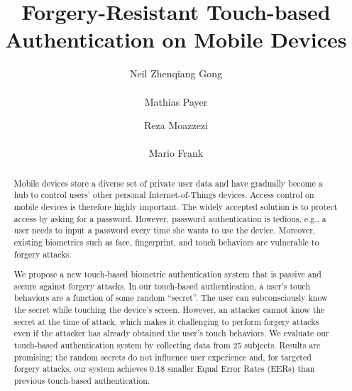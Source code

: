 \documentclass{sig-alternate-05-2015}
\begin{document}

\title{Forgery-Resistant Touch-based  Authentication on Mobile Devices}


\author{
\alignauthor Neil Zhenqiang Gong\\
       \\
\alignauthor Mathias Payer\\
\and
\alignauthor Reza Moazzezi\\
       \\
\alignauthor  Mario Frank\\
}
\maketitle

\begin{abstract}
Mobile devices store a diverse set of private user data and have gradually
become a hub to control users' other personal Internet-of-Things devices.
Access control on mobile devices is therefore highly important.  The widely
accepted solution is to protect access by asking for a password.  However,
password authentication is tedious, e.g., a user needs to input a password every
time she wants to use the device. Moreover, existing biometrics such as face,
fingerprint, and touch behaviors are vulnerable to forgery attacks. 

We propose a new touch-based biometric authentication system that is passive and
secure against forgery attacks.  In our touch-based authentication, a user's
touch behaviors are a function of some random ``secret''.  The user can
subconsciously know the secret while touching the device's screen. However, an
attacker cannot know the secret at the time of attack, which makes it
challenging to perform forgery attacks even if the attacker has already obtained
the user's touch behaviors.  We evaluate our touch-based authentication system
by collecting data from 25 subjects.  Results are promising: the random secrets
do not influence user experience and, for targeted forgery attacks, our system
achieves 0.18 smaller Equal Error Rates (EERs) than previous touch-based
authentication.  

\end{abstract}
\end{document}
